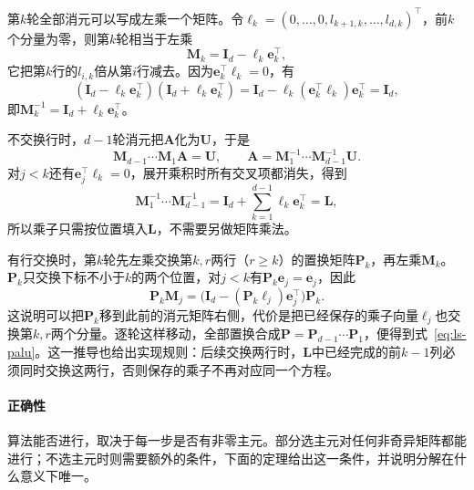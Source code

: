 第$k$轮全部消元可以写成左乘一个矩阵。令$\bm\ell_k=(0,\ldots,0,l_{k+1,k},\ldots,l_{d,k})^\top$，前$k$个分量为零，则第$k$轮相当于左乘
\[
 \bm M_k=\bm I_d-\bm\ell_k\bm e_k^\top ,
\]
它把第$k$行的$l_{i,k}$倍从第$i$行减去。因为$\bm e_k^\top\bm\ell_k=0$，有
\[
 (\bm I_d-\bm\ell_k\bm e_k^\top)(\bm I_d+\bm\ell_k\bm e_k^\top)
 =\bm I_d-\bm\ell_k(\bm e_k^\top\bm\ell_k)\bm e_k^\top=\bm I_d,
\]
即$\bm M_k^{-1}=\bm I_d+\bm\ell_k\bm e_k^\top$。

不交换行时，$d-1$轮消元把$\bm A$化为$\bm U$，于是
\[
 \bm M_{d-1}\cdots\bm M_1\bm A=\bm U,\qquad
 \bm A=\bm M_1^{-1}\cdots\bm M_{d-1}^{-1}\bm U .
\]
对$j<k$还有$\bm e_j^\top\bm\ell_k=0$，展开乘积时所有交叉项都消失，得到
\[
 \bm M_1^{-1}\cdots\bm M_{d-1}^{-1}=\bm I_d+\sum_{k=1}^{d-1}\bm\ell_k\bm e_k^\top=\bm L,
\]
所以乘子只需按位置填入$\bm L$，不需要另做矩阵乘法。

有行交换时，第$k$轮先左乘交换第$k,r$两行（$r\geq k$）的置换矩阵$\bm P_k$，再左乘$\bm M_k$。$\bm P_k$只交换下标不小于$k$的两个位置，对$j<k$有$\bm P_k\bm e_j=\bm e_j$，因此
\[
 \bm P_k\bm M_j=\bigl(\bm I_d-(\bm P_k\bm\ell_j)\bm e_j^\top\bigr)\bm P_k .
\]
这说明可以把$\bm P_k$移到此前的消元矩阵右侧，代价是把已经保存的乘子向量$\bm\ell_j$也交换第$k,r$两个分量。逐轮这样移动，全部置换合成$\bm P=\bm P_{d-1}\cdots\bm P_1$，便得到式~\eqref{eq:ls-palu}。这一推导也给出实现规则：后续交换两行时，$\bm L$中已经完成的前$k-1$列必须同时交换这两行，否则保存的乘子不再对应同一个方程。

\paragraph{正确性}
算法能否进行，取决于每一步是否有非零主元。部分选主元对任何非奇异矩阵都能进行；不选主元时则需要额外的条件，下面的定理给出这一条件，并说明分解在什么意义下唯一。

